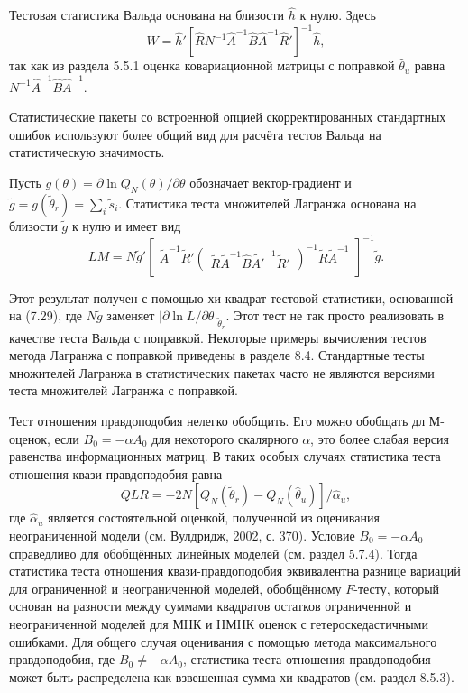 Тестовая статистика Вальда основана на близости $\hat{h}$ к нулю. Здесь
\begin{equation}
W = \hat{h}'[\hat{R}N^{-1}\hat{A}^{-1}\hat{B}\hat{A}^{-1}\hat{R}']^{-1}\hat{h},
\end{equation}
так как из раздела 5.5.1 оценка ковариационной матрицы с поправкой $\hat{\theta}_u$ равна $N^{-1}\hat{A}^{-1}\hat{B}\hat{A}^{-1}$.

Статистические пакеты со встроенной опцией скорректированных стандартных ошибок используют более общий вид для расчёта тестов Вальда на статистическую значимость.

Пусть $g(\theta) = \partial{\ln Q_N(\theta)}/\partial{\theta}$ обозначает вектор-градиент и $\tilde{g} = g(\tilde{\theta}_r) = \sum_i \tilde{s}_i$. Статистика теста множителей Лагранжа основана на близости $\tilde{g}$ к нулю и имеет вид
\begin{equation}
LM = N\tilde{g}'\begin{bmatrix} \tilde{A}^{-1} \tilde{R}'\begin{pmatrix}\tilde{R} \tilde{A}^{-1} \hat{B}\tilde{A'}^{-1}\tilde{R}'\end{pmatrix}^{-1}\tilde{R}\tilde{A}^{-1}\end{bmatrix}^{-1}\tilde{g}.
\end{equation}

Этот результат получен с помощью хи-квадрат тестовой статистики, основанной на (7.29), где $N\tilde{g}$ заменяет $|\partial{\ln L}/\partial{\theta}|_{\tilde{\theta}_r}$. Этот тест не так просто реализовать в качестве теста Вальда с поправкой. Некоторые примеры вычисления тестов метода Лагранжа с поправкой приведены в разделе 8.4.
Стандартные тесты множителей Лагранжа в статистических пакетах часто не являются версиями теста множителей Лагранжа с поправкой.

Тест отношения правдоподобия нелегко обобщить. Его можно обобщать дл М-оценок, если $B_0 = -\alpha A_0$  для некоторого скалярного $\alpha$, это более слабая версия равенства информационных матриц. В таких особых случаях статистика теста отношения квази-правдоподобия равна
\begin{equation}
QLR = -2N[Q_N(\tilde{\theta}_r) - Q_N(\hat{\theta}_u) ]/\hat{\alpha}_u,
\end{equation}
где $\hat{\alpha}_u$ является состоятельной оценкой, полученной из оценивания неограниченной модели (см. Вулдридж, 2002, с. 370). Условие $B_0 = -\alpha A_0$ справедливо для обобщённых линейных моделей (см. раздел 5.7.4). Тогда статистика теста отношения квази-правдоподобия эквивалентна разнице вариаций для ограниченной и неограниченной моделей, обобщённому $F$-тесту, который основан на разности между суммами квадратов остатков ограниченной и неограниченной моделей для МНК и НМНК оценок с гетероскедастичными ошибками. Для общего случая оценивания с помощью метода максимального правдоподобия, где $B_0 \not= - \alpha A_0$, статистика теста отношения правдоподобия может быть распределена как взвешенная сумма хи-квадратов (см. раздел 8.5.3).

